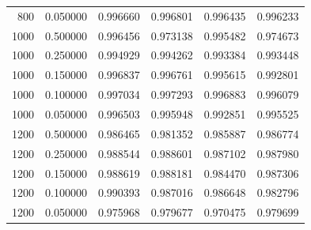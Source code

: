 \documentclass{article}
\begin{document}
\begin{tabular}{|r|r|r|r|r|r|}
800 & 0.050000 & 0.996660 & 0.996801 & 0.996435 & 0.996233 \\
1000 & 0.500000 & 0.996456 & 0.973138 & 0.995482 & 0.974673 \\
1000 & 0.250000 & 0.994929 & 0.994262 & 0.993384 & 0.993448 \\
1000 & 0.150000 & 0.996837 & 0.996761 & 0.995615 & 0.992801 \\
1000 & 0.100000 & 0.997034 & 0.997293 & 0.996883 & 0.996079 \\
1000 & 0.050000 & 0.996503 & 0.995948 & 0.992851 & 0.995525 \\
1200 & 0.500000 & 0.986465 & 0.981352 & 0.985887 & 0.986774 \\
1200 & 0.250000 & 0.988544 & 0.988601 & 0.987102 & 0.987980 \\
1200 & 0.150000 & 0.988619 & 0.988181 & 0.984470 & 0.987306 \\
1200 & 0.100000 & 0.990393 & 0.987016 & 0.986648 & 0.982796 \\
1200 & 0.050000 & 0.975968 & 0.979677 & 0.970475 & 0.979699 \\
\bottomrule
\end{tabular}
\end{document}
